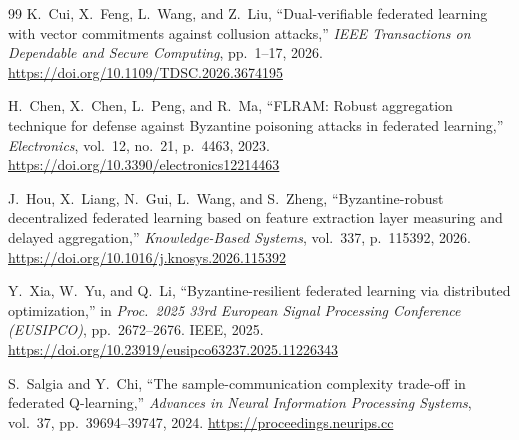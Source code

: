 \documentclass[12pt,a4paper]{article}
\begin{document}
\begin{thebibliography}{99}
K.~Cui, X.~Feng, L.~Wang, and Z.~Liu,
``Dual-verifiable federated learning with vector commitments against collusion
attacks,''
\textit{IEEE Transactions on Dependable and Secure Computing}, pp.~1--17, 2026.
\url{https://doi.org/10.1109/TDSC.2026.3674195}

H.~Chen, X.~Chen, L.~Peng, and R.~Ma,
``FLRAM: Robust aggregation technique for defense against Byzantine poisoning attacks
in federated learning,''
\textit{Electronics}, vol.~12, no.~21, p.~4463, 2023.
\url{https://doi.org/10.3390/electronics12214463}

J.~Hou, X.~Liang, N.~Gui, L.~Wang, and S.~Zheng,
``Byzantine-robust decentralized federated learning based on feature extraction layer
measuring and delayed aggregation,''
\textit{Knowledge-Based Systems}, vol.~337, p.~115392, 2026.
\url{https://doi.org/10.1016/j.knosys.2026.115392}

Y.~Xia, W.~Yu, and Q.~Li,
``Byzantine-resilient federated learning via distributed optimization,''
in \textit{Proc.\ 2025 33rd European Signal Processing Conference (EUSIPCO)},
pp.~2672--2676. IEEE, 2025.
\url{https://doi.org/10.23919/eusipco63237.2025.11226343}

S.~Salgia and Y.~Chi,
``The sample-communication complexity trade-off in federated Q-learning,''
\textit{Advances in Neural Information Processing Systems}, vol.~37,
pp.~39694--39747, 2024.
\url{https://proceedings.neurips.cc}

\end{thebibliography}
\end{document}
